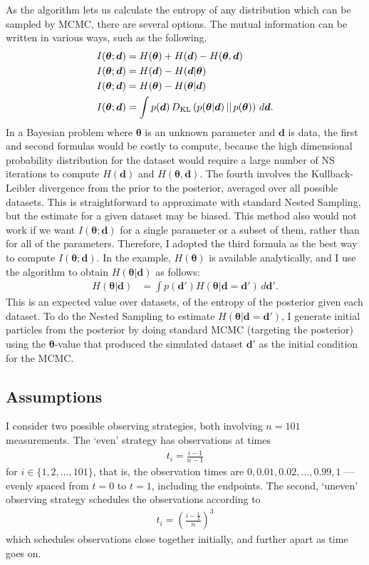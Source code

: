 \documentclass[entropy,article,accept,oneauthor,pdftex,10pt,a4paper]{mdpi}
\renewcommand{\d}{\boldsymbol{d}}
\newcommand{\x}{\boldsymbol{\theta}}
\begin{document}
As the algorithm lets us calculate the entropy of any distribution which can
be sampled by MCMC, there are several options. The mutual information
can be written in various ways, such as the following.
\begin{align}
I(\x; \d) &= H(\x) + H(\d) - H(\x, \d) \\
I(\x; \d) &= H(\d) - H(\d|\x) \\
I(\x; \d) &= H(\x) - H(\x|\d) \\
I(\x; \d) &= \int p(\d) \, D_{\rm KL}\left(p(\x|\d) \,||\, p(\x)\right) \, d\d.
\end{align}
In a Bayesian problem where $\x$ is an unknown parameter and $\d$ is data, the
first and second formulas would be costly to compute, because the
high dimensional probability distribution for the dataset would require a
large number of NS iterations to compute $H(\d)$ and $H(\x, \d)$.
The fourth involves the Kullback-Leibler divergence from the prior to the
posterior, averaged over all possible datasets. This is straightforward to
approximate with standard Nested Sampling, but the estimate for a given dataset
may be biased. This method also would not work if we want $I(\x; \d)$ for
a single parameter or a subset of them, rather than for all of the parameters.
Therefore, I adopted the third formula as the best way to compute $I(\x; \d)$.
In the example, $H(\x)$ is available analytically, and I use the algorithm to
obtain $H(\x | \d)$ as follows:
\begin{align}
H(\x | \d) &= \int p(\d') H(\x | \d=\d') \, d\d'.
\end{align}
This is an expected value over datasets, of the entropy of the posterior given
each dataset. To do the Nested Sampling to estimate $H(\x | \d=\d')$, I generate
initial particles from the posterior by doing standard MCMC (targeting the
posterior) using the $\x$-value that produced the simulated dataset $\d'$ as
the initial condition for the MCMC.

\subsection{Assumptions}

I consider two possible observing strategies, both involving
$n=101$ measurements. The `even' strategy has observations at times
\begin{align}
t_i = \frac{i-1}{n-1}
\end{align}
for $i \in \{1, 2, ..., 101\}$, that is, the observation times are
$0, 0.01, 0.02, ..., 0.99, 1$ ---
evenly spaced from $t=0$ to $t=1$, including the endpoints.
The second, `uneven' observing strategy schedules the observations
according to
\begin{align}
t_i = \left(\frac{i - \frac{1}{2}}{n}\right)^3
\end{align}
which schedules observations close together initially, and further apart
as time goes on.
\end{document}
